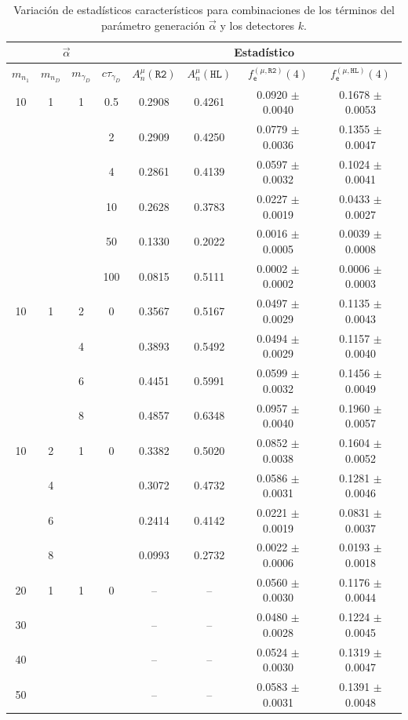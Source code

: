 \begin{table}[!t]
\centering
\footnotesize
\begin{tabular}{|cccccccc|}
\hline
\multicolumn{4}{|c|}{$\vec{\alpha}$} & \multicolumn{4}{|c|}{Estadístico} \\
\hline
$m_{n_1}$ & $m_{n_D}$ & $m_{\gamma_D}$ & $c\tau_{\gamma_D}$ & 
$A_n^\mu(\texttt{R2})$ & 
$A_n^\mu(\texttt{HL})$ & 
$f^{(\mu, \texttt{R2})}_\textsf{e} (4)$ & 
$f^{(\mu, \texttt{HL})}_\textsf{e} (4)$ \\
\hline
10 & 1 & 1 & 0.5 & 0.2908 & 0.4261 & 0.0920 $\pm$ 0.0040 & 0.1678 $\pm$ 0.0053\\
& & & 2 & 0.2909 & 0.4250 & 0.0779 $\pm$ 0.0036 & 0.1355 $\pm$ 0.0047 \\
& & & 4 & 0.2861 & 0.4139 & 0.0597 $\pm$ 0.0032 & 0.1024 $\pm$ 0.0041\\
& & & 10 & 0.2628 & 0.3783 & 0.0227 $\pm$ 0.0019 & 0.0433 $\pm$ 0.0027\\
& & & 50 & 0.1330 & 0.2022 & 0.0016 $\pm$ 0.0005 & 0.0039 $\pm$ 0.0008\\
& & & 100 & 0.0815 & 0.5111 & 0.0002 $\pm$ 0.0002 & 0.0006 $\pm$ 0.0003\\
\hline
10 & 1 & 2 & 0 & 0.3567 & 0.5167 & 0.0497 $\pm$ 0.0029 & 0.1135 $\pm$ 0.0043 \\
& & 4 & & 0.3893 & 0.5492 & 0.0494 $\pm$ 0.0029 & 0.1157 $\pm$ 0.0040 \\
& & 6 & & 0.4451 & 0.5991 & 0.0599 $\pm$ 0.0032 & 0.1456 $\pm$ 0.0049\\
& & 8 & & 0.4857 & 0.6348 & 0.0957 $\pm$ 0.0040 & 0.1960 $\pm$ 0.0057\\
\hline
10 & 2 & 1 & 0 & 0.3382 & 0.5020 & 0.0852 $\pm$ 0.0038 & 0.1604 $\pm$ 0.0052\\
& 4 & & & 0.3072 & 0.4732 & 0.0586 $\pm$ 0.0031 & 0.1281 $\pm$ 0.0046 \\
& 6 & & & 0.2414 & 0.4142 & 0.0221 $\pm$ 0.0019 & 0.0831 $\pm$ 0.0037\\
& 8 & & & 0.0993 & 0.2732 & 0.0022 $\pm$ 0.0006 & 0.0193 $\pm$ 0.0018\\
\hline
20 & 1 & 1 & 0 & -- & -- & 0.0560 $\pm$ 0.0030 & 0.1176 $\pm$ 0.0044 \\
30 & & & &  --  & -- & 0.0480 $\pm$ 0.0028 & 0.1224 $\pm$ 0.0045\\
40 & & & & -- & -- &  0.0524 $\pm$ 0.0030 &  0.1319 $\pm$ 0.0047 \\
50 & & & & -- & -- & 0.0583 $\pm$ 0.0031 & 0.1391 $\pm$ 0.0048 \\
\hline
\end{tabular}
\caption{Variación de estadísticos característicos para combinaciones de los términos del parámetro generación $\vec{\alpha}$ y los detectores $k$.}
\label{Numero_de_Entradas}
\end{table}

